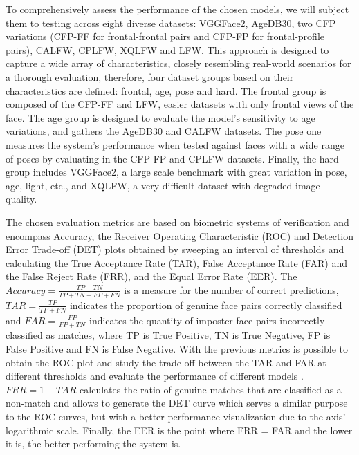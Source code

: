 \documentclass[class=report, crop=false, a4paper, 12pt]{standalone}
\begin{document}
\par To comprehensively assess the performance of the chosen models, we will subject them to testing across eight diverse datasets: VGGFace2, AgeDB30, two CFP variations (CFP-FF for frontal-frontal pairs and CFP-FP for frontal-profile pairs), CALFW, CPLFW, XQLFW and LFW. This approach is designed to capture a wide array of characteristics, closely resembling real-world scenarios for a thorough evaluation, therefore, four dataset groups based on their characteristics are defined: frontal, age, pose and hard. The frontal group is composed of the CFP-FF and LFW, easier datasets with only frontal views of the face. The age group is designed to evaluate the model's sensitivity to age variations, and gathers the AgeDB30 and CALFW datasets. The pose one measures the system's performance when tested against faces with a wide range of poses by evaluating in the CFP-FP and CPLFW datasets. Finally, the hard group includes VGGFace2, a large scale benchmark with great variation in pose, age, light, etc., and XQLFW, a very difficult dataset with degraded image quality. 

\par The chosen evaluation metrics are based on biometric systems of verification and encompass Accuracy, the Receiver Operating Characteristic (ROC) and Detection Error Trade-off (DET) plots obtained by sweeping an interval of thresholds and calculating the True Acceptance Rate (TAR), False Acceptance Rate (FAR) and the False Reject Rate (FRR), and the Equal Error Rate (EER). The $Accuracy=\frac{TP+TN}{TP+TN+FP+FN}$ is a measure for the number of correct predictions, $TAR=\frac{TP}{TP+FN}$ indicates the proportion of genuine face pairs correctly classified and $FAR=\frac{FP}{FP+TN}$ indicates the quantity of imposter face pairs incorrectly classified as matches, where TP is True Positive, TN is True Negative, FP is False Positive and FN is False Negative. With the previous metrics is possible to obtain the ROC plot and study the trade-off between the TAR and FAR at different thresholds and evaluate the performance of different models . $FRR = 1 - TAR$ calculates the ratio of genuine matches that are classified as a non-match and allows to generate the DET curve which serves a similar purpose to the ROC curves, but with a better performance visualization due to the axis' logarithmic scale. Finally, the EER is the point where FRR = FAR and the lower it is, the better performing the system is. 


\end{document}
